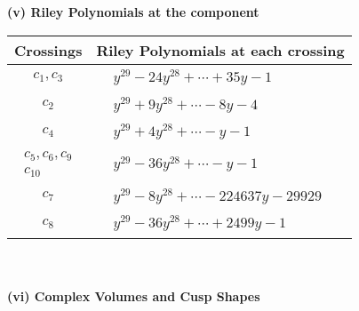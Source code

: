 \documentclass[1p]{elsarticle_modified}
\theoremstyle{definition}
\begin{document}
\newpage\renewcommand{\arraystretch}{1}
\flushleft \textbf{(v) Riley Polynomials at the component}\newline \\
\begin{tabular}{m{50pt}|m{274pt}}
Crossings & \hspace{64pt}Riley Polynomials at each crossing \\
\hline $$\begin{aligned}c_{1},c_{3}\end{aligned}$$&$\begin{aligned}
&y^{29}-24 y^{28}+\cdots+35 y-1
\end{aligned}$\\
\hline $$\begin{aligned}c_{2}\end{aligned}$$&$\begin{aligned}
&y^{29}+9 y^{28}+\cdots-8 y-4
\end{aligned}$\\
\hline $$\begin{aligned}c_{4}\end{aligned}$$&$\begin{aligned}
&y^{29}+4 y^{28}+\cdots- y-1
\end{aligned}$\\
\hline $$\begin{aligned}c_{5},c_{6},c_{9}\\c_{10}\end{aligned}$$&$\begin{aligned}
&y^{29}-36 y^{28}+\cdots- y-1
\end{aligned}$\\
\hline $$\begin{aligned}c_{7}\end{aligned}$$&$\begin{aligned}
&y^{29}-8 y^{28}+\cdots-224637 y-29929
\end{aligned}$\\
\hline $$\begin{aligned}c_{8}\end{aligned}$$&$\begin{aligned}
&y^{29}-36 y^{28}+\cdots+2499 y-1
\end{aligned}$\\
\hline
\end{tabular}\\~\\
\newpage\flushleft \textbf{(vi) Complex Volumes and Cusp Shapes}
\end{document}
